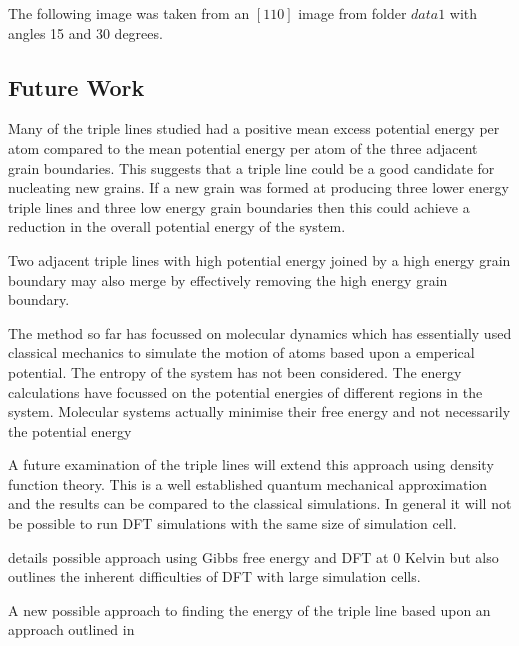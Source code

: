 \documentclass[12pt,a4paper]{book}
\begin{document}
The following image was taken from an $[1 1 0]$ image from folder $data1$ with angles 15 and 30 degrees.


\subsection{Future Work}


Many of the triple lines studied had a positive mean excess potential energy per atom compared to the mean potential energy per atom of the three adjacent grain boundaries. This suggests that a triple line could be a good candidate for nucleating new grains. If a new grain was formed at producing three lower energy triple lines and three low energy grain boundaries then this could achieve a reduction in the overall potential energy of the system.

Two adjacent triple lines with high potential energy joined by a high energy grain boundary may also merge by effectively removing the high energy grain boundary. 


The method so far has focussed on molecular dynamics which has essentially used classical mechanics to simulate the motion of atoms based upon a emperical potential. The entropy of the system has not been considered. The energy calculations have focussed on the potential energies of different regions in the system. Molecular systems actually minimise their free energy and not necessarily the potential energy 

A future examination of the triple lines will extend this approach using density function theory. This is a well established quantum mechanical approximation and the results can be compared to the classical simulations. In general it will not be possible to run DFT simulations with the same size of simulation cell.

\cite{HASHIBON2010939} details possible approach using Gibbs free energy and DFT at 0 Kelvin but also outlines the inherent difficulties of DFT with large simulation cells.

A new possible approach to finding the energy of the triple line based upon an approach outlined in \cite{Lee2004}

  

 
\end{document}
